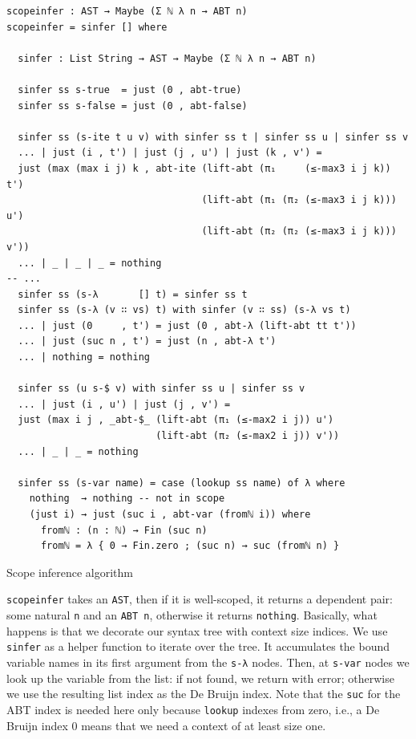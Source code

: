 \begin{listing}[H]
\begin{verbatim}
scopeinfer : AST → Maybe (Σ ℕ λ n → ABT n)
scopeinfer = sinfer [] where

  sinfer : List String → AST → Maybe (Σ ℕ λ n → ABT n)

  sinfer ss s-true  = just (0 , abt-true)
  sinfer ss s-false = just (0 , abt-false)

  sinfer ss (s-ite t u v) with sinfer ss t | sinfer ss u | sinfer ss v
  ... | just (i , t') | just (j , u') | just (k , v') =
  just (max (max i j) k , abt-ite (lift-abt (π₁     (≤-max3 i j k))  t')
                                  (lift-abt (π₁ (π₂ (≤-max3 i j k))) u')
                                  (lift-abt (π₂ (π₂ (≤-max3 i j k))) v'))
  ... | _ | _ | _ = nothing
-- ...
  sinfer ss (s-λ       [] t) = sinfer ss t
  sinfer ss (s-λ (v ∷ vs) t) with sinfer (v ∷ ss) (s-λ vs t)
  ... | just (0     , t') = just (0 , abt-λ (lift-abt tt t'))
  ... | just (suc n , t') = just (n , abt-λ t')
  ... | nothing = nothing

  sinfer ss (u s-$ v) with sinfer ss u | sinfer ss v
  ... | just (i , u') | just (j , v') =
  just (max i j , _abt-$_ (lift-abt (π₁ (≤-max2 i j)) u')
                          (lift-abt (π₂ (≤-max2 i j)) v'))
  ... | _ | _ = nothing

  sinfer ss (s-var name) = case (lookup ss name) of λ where
    nothing  → nothing -- not in scope
    (just i) → just (suc i , abt-var (fromℕ i)) where
      fromℕ : (n : ℕ) → Fin (suc n)
      fromℕ = λ { 0 → Fin.zero ; (suc n) → suc (fromℕ n) }
\end{verbatim}
\caption{Scope inference algorithm}
\label{code:abt-scopeinfer}
\end{listing}

\verb$scopeinfer$ takes an \verb$AST$, then if it is well-scoped, it returns a dependent pair: some natural \verb$n$ and an \verb$ABT n$, otherwise it returns \verb$nothing$. Basically, what happens is that we decorate our syntax tree with context size indices. We use \verb$sinfer$ as a helper function to iterate over the tree. It accumulates the bound variable names in its first argument from the \verb$s-λ$ nodes. Then, at \verb$s-var$ nodes we look up the variable from the list: if not found, we return with error; otherwise we use the resulting list index as the De Bruijn index. Note that the \verb$suc$ for the ABT index is needed here only because \verb$lookup$ indexes from zero, i.e., a De Bruijn index 0 means that we need a context of at least size one.

